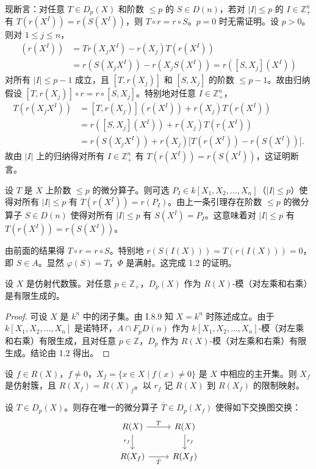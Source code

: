 现断言：对任意 $T\in D_p(X)$ 和阶数 $\le p$ 的 $S\in D(n)$，若对 $|I|\le p$ 的 $I\in\mathbb{Z}_+^n$ 有 $T(r(X^I))=r(S(X^I))$，则 $T\circ r=r\circ S$。$p=0$ 时无需证明。设 $p>0$。则对 $1\le j\le n$，
\begin{align*}
[T,r(X_j)](r(X^I))&=T r(X_jX^I)-r(X_j)T(r(X^I))\\
&=r(S(X_jX^I))-r(X_jS(X^I))=r([S,X_j](X^I))
\end{align*}
对所有 $|I|\le p-1$ 成立，且 $[T,r(X_j)]$ 和 $[S,X_j]$ 的阶数 $\le p-1$。故由归纳假设 $[T,r(X_j)]\circ r=r\circ[S,X_j]$。特别地对任意 $I\in\mathbb{Z}_+^n$，
\begin{align*}
T(r(X_jX^I))&=[T,r(X_j)](r(X^I))+r(X_j)T(r(X^I))\\
&=r([S,X_j](X^I))+r(X_j)T(r(X^I))\\
&=r(S(X_jX^I))+r(X_j)\bigl[T(r(X^I))-r(S(X^I))\bigr].
\end{align*}
故由 $|I|$ 上的归纳得对所有 $I\in\mathbb{Z}_+^n$ 有 $T(r(X^I))=r(S(X^I))$，这证明断言。

设 $T$ 是 $X$ 上阶数 $\le p$ 的微分算子。则可选 $P_I\in k[X_1,X_2,\dots,X_n]$（$|I|\le p$）使得对所有 $|I|\le p$ 有 $T(r(X^I))=r(P_I)$。由上一条引理存在阶数 $\le p$ 的微分算子 $S\in D(n)$ 使得对所有 $|I|\le p$ 有 $S(X^I)=P_I$。这意味着对 $|I|\le p$ 有 $T(r(X^I))=r(S(X^I))$。

由前面的结果得 $T\circ r=r\circ S$。特别地 $r(S(I(X)))=T(r(I(X)))=0$，即 $S\in A$。显然 $\varphi(S)=T$，$\Phi$ 是满射。这完成 1.2 的证明。

\begin{corollary}
设 $X$ 是仿射代数簇。对任意 $p\in\mathbb{Z}_+$，$D_p(X)$ 作为 $R(X)$-模（对左乘和右乘）是有限生成的。
\end{corollary}

\begin{proof}
可设 $X$ 是 $k^n$ 中的闭子集。由 I.8.9 知 $X=k^n$ 时陈述成立。由于 $k[X_1,X_2,\dots,X_n]$ 是诺特环，$A\cap F_pD(n)$ 作为 $k[X_1,X_2,\dots,X_n]$-模（对左乘和右乘）有限生成，且对任意 $p\in\mathbb{Z}$，$D_p$ 作为 $R(X)$-模（对左乘和右乘）有限生成。结论由 1.2 得出。
\end{proof}

设 $f\in R(X)$，$f\neq 0$，$X_f=\{x\in X\mid f(x)\neq 0\}$ 是 $X$ 中相应的主开集。则 $X_f$ 是仿射簇，且 $R(X_f)=R(X)_f$。以 $r_f$ 记 $R(X)$ 到 $R(X_f)$ 的限制映射。

\begin{proposition}
设 $T\in D_p(X)$。则存在唯一的微分算子 $\bar T\in D_p(X_f)$ 使得如下交换图交换：
$$\begin{tikzcd}
R(X) \arrow[r,"T"] \arrow[d,"r_f"' ] & R(X) \arrow[d,"r_f"]\\
R(X_f) \arrow[r,"\bar T"'] & R(X_f)
\end{tikzcd}$$
\end{proposition}

